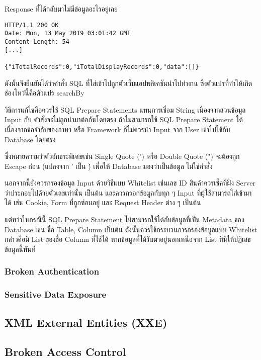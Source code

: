Response ที่ได้กลับมาไม่มีข้อมูลอะไรอยู่เลย

\begin{lstlisting}[numbers=none] 
HTTP/1.1 200 OK
Date: Mon, 13 May 2019 03:01:42 GMT
Content-Length: 54
[...]

{"iTotalRecords":0,"iTotalDisplayRecords":0,"data":[]}
\end{lstlisting}

ดังนั้นจึงยืนยันได้ว่าคำสั่ง SQL ที่ใส่เข้าไปถูกตัวเว็บแอปพลิเคชันนำไปทำงาน ซึ่งตัวแปรที่ทำให้เกิดช่องโหว่นี้คือตัวแปร searchBy

วิธีการแก้ไขคือควรใช้ SQL Prepare Statements แทนการเชื่อม String เนื่องจากส่วนข้อมูล Input กับ คำสั่งจะไม่ถูกนำมาต่อกันโดยตรง ถ้าไม่สามารถใช้ SQL Prepare Statement ได้ เนื่องจากข้อจำกับของภาษา หรือ Framework ก็ไม่ควรนำ Input จาก User เข้าไปใช้กับ Database โดยตรง

ซึ่งหมายความว่าตัวอักขระพิเศษเช่น Single Quote (') หรือ Double Quote (") จะต้องถูก Escape ก่อน (แปลงจาก ' เป็น \') เพื่อให้ Database มองว่าเป็นข้อมูล ไม่ใช่คำสั่ง

นอกจากนี้ยังควรกรองข้อมูล Input ด้วยวิธีแบบ Whitelist เช่นเลข ID สินค้าควรเช็คที่ฝั่ง Server ว่าประกอบไปด้วยตัวเลขเท่านั้น เป็นต้น และควรกรอกข้อมูลกับทุก ๆ Input ที่ผู้ใช้สามารถใส่เข้ามาได้ เช่น Cookie, Form ที่ถูกซ่อนอยู่ และ Request Header ต่าง ๆ เป็นต้น

แต่ทว่าในกรณีนี้ SQL Prepare Statement ไม่สามารถใช้ได้กับข้อมูลที่เป็น Metadata ของ Database เช่น ชื่อ Table, Column เป็นต้น ดังนั้นควรใช้กระบวนการกรองข้อมูลแบบ Whitelist กล่าวคือมี List ของชื่อ Column ที่ใช้ได้ หากข้อมูลที่ได้รับมาอยู่นอกเหนือจาก List ที่มีให้ปฏิเสธข้อมูลนี้ทันที

\subsubsection{Broken Authentication}

\subsubsection{Sensitive Data Exposure}

\subsection{XML External Entities (XXE)}

\subsection{Broken Access Control}

